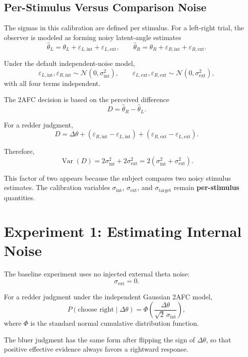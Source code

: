 \documentclass[11pt]{article}
\begin{document}
\subsection{Per-Stimulus Versus Comparison Noise}

The sigmas in this calibration are defined per stimulus. For a left-right
trial, the observer is modeled as forming noisy latent-angle estimates
\[
\hat{\theta}_L
= \theta_L
+ \varepsilon_{L,\mathrm{int}}
+ \varepsilon_{L,\mathrm{ext}},
\qquad
\hat{\theta}_R
= \theta_R
+ \varepsilon_{R,\mathrm{int}}
+ \varepsilon_{R,\mathrm{ext}}.
\]

Under the default independent-noise model,
\[
\varepsilon_{L,\mathrm{int}}, \varepsilon_{R,\mathrm{int}}
\sim \mathcal{N}(0,\sigma_{\mathrm{int}}^2),
\qquad
\varepsilon_{L,\mathrm{ext}}, \varepsilon_{R,\mathrm{ext}}
\sim \mathcal{N}(0,\sigma_{\mathrm{ext}}^2),
\]
with all four terms independent.

The 2AFC decision is based on the perceived difference
\[
D = \hat{\theta}_R - \hat{\theta}_L.
\]

For a redder judgment,
\[
D
= \Delta\theta
+ (\varepsilon_{R,\mathrm{int}} - \varepsilon_{L,\mathrm{int}})
+ (\varepsilon_{R,\mathrm{ext}} - \varepsilon_{L,\mathrm{ext}}).
\]

Therefore,
\[
\operatorname{Var}(D)
= 2\sigma_{\mathrm{int}}^2 + 2\sigma_{\mathrm{ext}}^2
= 2\left(\sigma_{\mathrm{int}}^2 + \sigma_{\mathrm{ext}}^2\right).
\]

This factor of two appears because the subject compares two noisy stimulus
estimates. The calibration variables $\sigma_{\mathrm{int}}$,
$\sigma_{\mathrm{ext}}$, and $\sigma_{\mathrm{target}}$ remain
\textbf{per-stimulus} quantities.

\section{Experiment 1: Estimating Internal Noise}

The baseline experiment uses no injected external theta noise:
\[
\sigma_{\mathrm{ext}} = 0.
\]

For a redder judgment under the independent Gaussian 2AFC model,
\[
P(\text{choose right} \mid \Delta\theta)
= \Phi\!\left(
\frac{\Delta\theta}{\sqrt{2}\,\sigma_{\mathrm{int}}}
\right),
\]
where $\Phi$ is the standard normal cumulative distribution function.

The bluer judgment has the same form after flipping the sign of
$\Delta\theta$, so that positive effective evidence always favors a rightward
response.
\end{document}
